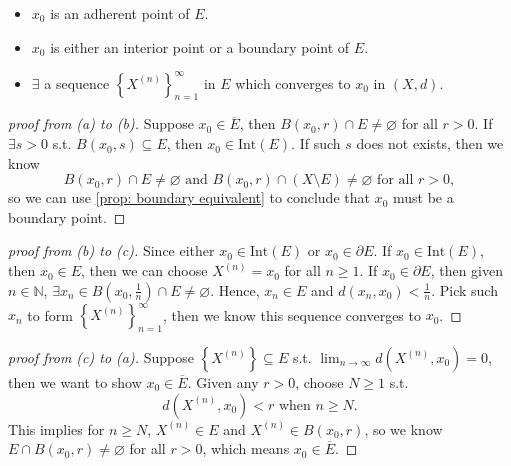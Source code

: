 \begin{proposition}[TFAE]
    \vphantom{text}
    \begin{itemize}
        \item [(a)] \(x_0\) is an adherent point of \(E\). 
        \item [(b)] \(x_0\) is either an interior point or a boundary point of \(E\). 
        \item [(c)] \(\exists \) a sequence \(\left\{ X^{(n)} \right\}_{n=1}^{\infty}  \) in \(E\) which converges to \(x_0\) in \((X, d)\).        
    \end{itemize}
\end{proposition}
\begin{proof}[proof from (a) to (b)]
    Suppose \(x_0 \in \overline{E} \), then \(B(x_0, r) \cap E \neq \varnothing \) for all \(r > 0\). If \(\exists s > 0\) s.t. \(B(x_0, s) \subseteq E\), then \(x_0 \in \mathrm{Int}(E)\). If such \(s\) does not exists, then we know
    \[
        B(x_0, r) \cap E \neq \varnothing \text{ and } B(x_0, r) \cap (X \setminus E) \neq \varnothing \text{ for all } r>0,
    \]
    so we can use \autoref{prop: boundary equivalent} to conclude that \(x_0\) must be a boundary point.        
\end{proof}
\begin{proof}[proof from (b) to (c)]
    Since either \(x_0 \in \mathrm{Int}(E) \) or \(x_0 \in \partial E\). If \(x_0 \in \mathrm{Int}(E) \), then \(x_0 \in E\), then we can choose \(X^{(n)} = x_0\) for all \(n \ge 1\). If \(x_0 \in \partial E\), then given \(n \in \mathbb{N} \), \(\exists x_n \in B\left( x_0, \frac{1}{n} \right) \cap E \neq \varnothing \). Hence, \(x_n \in E\) and \(d(x_n, x_0) < \frac{1}{n}\). Pick such \(x_n\) to form \(\left\{ X^{(n)} \right\}_{n=1}^{\infty}  \), then we know this sequence converges to \(x_0\).       
\end{proof}
\begin{proof}[proof from (c) to (a)]
    Suppose \(\left\{ X^{(n)} \right\}  \subseteq E\) s.t. \(\lim_{n \to \infty} d\left( X^{(n)}, x_0 \right) = 0  \), then we want to show \(x_0 \in \overline{E} \). Given any \(r > 0\), choose \(N \ge 1\) s.t. 
    \[
        d \left( X^{(n)}, x_0 \right) < r \text{ when } n \ge N. 
    \]     
    This implies for \(n \ge N\), \(X^{(n)} \in E\) and \(X^{(n)} \in B(x_0, r)\), so we know \(E \cap B(x_0, r) \neq \varnothing \) for all \(r > 0\), which means \(x_0 \in \overline{E} \).   
\end{proof}

